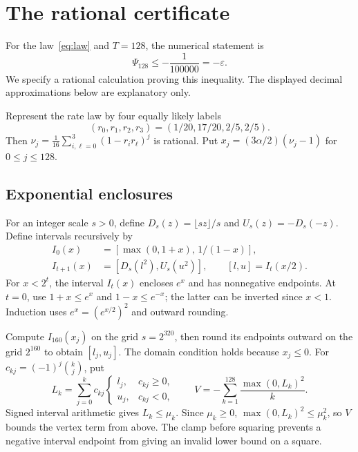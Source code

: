 \documentclass[11pt]{article}
\theoremstyle{remark}
\begin{document}
\section{The rational certificate}\label{sec:certificate}
For the law~\eqref{eq:law} and $T=128$, the numerical statement is
\begin{equation}\label{eq:negative}
 \Psi_{128}\leq-\frac1{100000}=-\varepsilon.
\end{equation}
We specify a rational calculation proving this inequality. The displayed
decimal approximations below are explanatory only.

Represent the rate law by four equally likely labels
\[
 (r_0,r_1,r_2,r_3)=(1/20,17/20,2/5,2/5).
\]
Then $\nu_j=\frac1{16}\sum_{i,\ell=0}^3(1-r_ir_\ell)^j$ is rational.
Put $x_j=(3\alpha/2)(\nu_j-1)$ for $0\leq j\leq128$.

\subsection{Exponential enclosures}
For an integer scale $s>0$, define
$D_s(z)=\lfloor sz\rfloor/s$ and $U_s(z)=-D_s(-z)$. Define intervals
recursively by
\begin{align*}
 I_0(x)&=[\max(0,1+x),\,1/(1-x)],\\
 I_{t+1}(x)&=[D_s(l^2),U_s(u^2)],
       \qquad [l,u]=I_t(x/2).
\end{align*}
For $x<2^t$, the interval $I_t(x)$ encloses $e^x$ and has nonnegative
endpoints. At $t=0$, use $1+x\leq e^x$ and
$1-x\leq e^{-x}$; the latter can be inverted since $x<1$.
Induction uses $e^x=(e^{x/2})^2$ and outward rounding.

Compute $I_{160}(x_j)$ on the grid $s=2^{320}$, then round its endpoints
outward on the grid $2^{160}$ to obtain $[l_j,u_j]$. The domain condition
holds because $x_j\leq0$. For $c_{kj}=(-1)^j\binom kj$, put
\[
 L_k=\sum_{j=0}^k c_{kj}
 \begin{cases}l_j,&c_{kj}\geq0,\\u_j,&c_{kj}<0,\end{cases}
 \qquad V=-\sum_{k=1}^{128}\frac{\max(0,L_k)^2}{k}.
\]
Signed interval arithmetic gives $L_k\leq\mu_k$. Since $\mu_k\geq0$,
$\max(0,L_k)^2\leq\mu_k^2$, so $V$ bounds the vertex term from above.
The clamp before squaring prevents a negative interval endpoint from
giving an invalid lower bound on a square.
\end{document}
